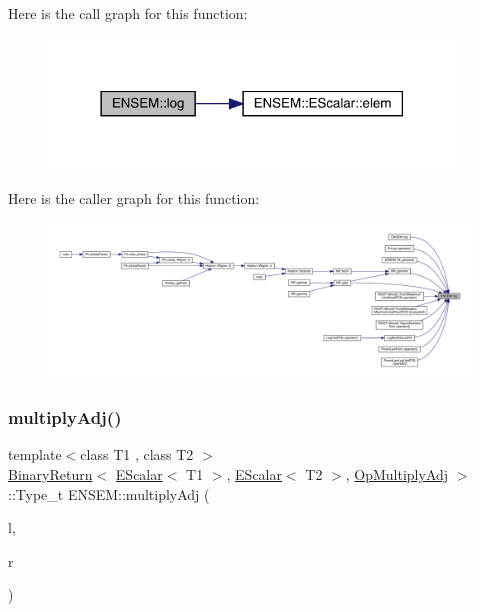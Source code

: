 Here is the call graph for this function\+:
\nopagebreak
\begin{figure}[H]
\begin{center}
\leavevmode
\includegraphics[width=306pt]{d4/dca/group__escalar_gabe969a92b7a6a506a417bb17fdf68b4c_cgraph}
\end{center}
\end{figure}
Here is the caller graph for this function\+:
\nopagebreak
\begin{figure}[H]
\begin{center}
\leavevmode
\includegraphics[width=350pt]{d4/dca/group__escalar_gabe969a92b7a6a506a417bb17fdf68b4c_icgraph}
\end{center}
\end{figure}
\mbox{\label{group__escalar_ga90260817012914a08b2475f4cc5c94a7}} 
\subsubsection{\texorpdfstring{multiplyAdj()}{multiplyAdj()}}
{\footnotesize\ttfamily template$<$class T1 , class T2 $>$ \\
\mbox{\hyperlink{structENSEM_1_1BinaryReturn}{Binary\+Return}}$<$ \mbox{\hyperlink{classENSEM_1_1EScalar}{E\+Scalar}}$<$ T1 $>$, \mbox{\hyperlink{classENSEM_1_1EScalar}{E\+Scalar}}$<$ T2 $>$, \mbox{\hyperlink{structENSEM_1_1OpMultiplyAdj}{Op\+Multiply\+Adj}} $>$\+::Type\+\_\+t E\+N\+S\+E\+M\+::multiply\+Adj (\begin{DoxyParamCaption}\item[{const \mbox{\hyperlink{classENSEM_1_1EScalar}{E\+Scalar}}$<$ T1 $>$ \&}]{l,  }\item[{const \mbox{\hyperlink{classENSEM_1_1EScalar}{E\+Scalar}}$<$ T2 $>$ \&}]{r }\end{DoxyParamCaption})\hspace{0.3cm}{\ttfamily [inline]}}

